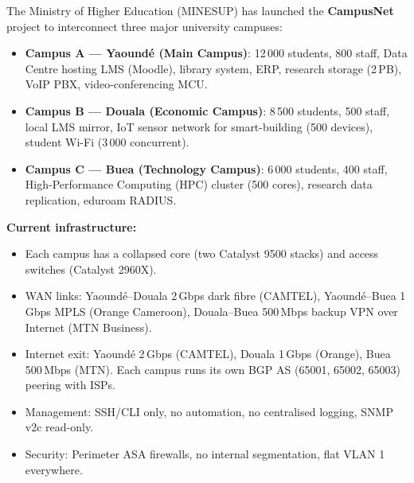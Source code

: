 \documentclass[11pt]{article}
\newcounter{popsec}
\newcounter{popsub}
\newcommand{\courssub}[1]{%
  \stepcounter{popsub}%
  \par\vspace{9pt}\noindent{\popxbold\fontsize{11.5}{13}\selectfont\color{popink}{\color{poporange}\thepopsec.\thepopsub}\hspace{6pt}#1}\par\nopagebreak\vspace{4pt}
}
\begin{document}
\courssub{Situation}
\begin{experience}
The Ministry of Higher Education (MINESUP) has launched the \textbf{CampusNet} project to interconnect three major university campuses:
\begin{itemize}
    \item \textbf{Campus A — Yaoundé (Main Campus)}: 12\,000 students, 800 staff, Data Centre hosting LMS (Moodle), library system, ERP, research storage (2\,PB), VoIP PBX, video-conferencing MCU.
    \item \textbf{Campus B — Douala (Economic Campus)}: 8\,500 students, 500 staff, local LMS mirror, IoT sensor network for smart-building (500 devices), student Wi-Fi (3\,000 concurrent).
    \item \textbf{Campus C — Buea (Technology Campus)}: 6\,000 students, 400 staff, High-Performance Computing (HPC) cluster (500 cores), research data replication, eduroam RADIUS.
\end{itemize}

\medskip
\textbf{Current infrastructure:}
\begin{itemize}
    \item Each campus has a collapsed core (two Catalyst 9500 stacks) and access switches (Catalyst 2960X).
    \item WAN links: Yaoundé–Douala 2\,Gbps dark fibre (CAMTEL), Yaoundé–Buea 1\,Gbps MPLS (Orange Cameroon), Douala–Buea 500\,Mbps backup VPN over Internet (MTN Business).
    \item Internet exit: Yaoundé 2\,Gbps (CAMTEL), Douala 1\,Gbps (Orange), Buea 500\,Mbps (MTN). Each campus runs its own BGP AS (65001, 65002, 65003) peering with ISPs.
    \item Management: SSH/CLI only, no automation, no centralised logging, SNMP v2c read-only.
    \item Security: Perimeter ASA firewalls, no internal segmentation, flat VLAN 1 everywhere.
\end{itemize}


\end{experience}
\end{document}

